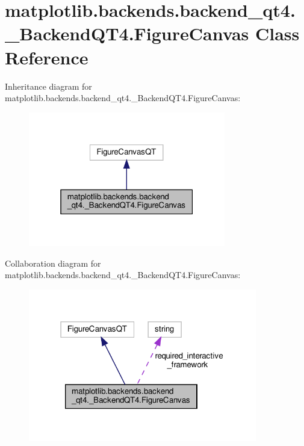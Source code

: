 \hypertarget{classmatplotlib_1_1backends_1_1backend__qt4_1_1__BackendQT4_1_1FigureCanvas}{}\section{matplotlib.\+backends.\+backend\+\_\+qt4.\+\_\+\+Backend\+Q\+T4.\+Figure\+Canvas Class Reference}
\label{classmatplotlib_1_1backends_1_1backend__qt4_1_1__BackendQT4_1_1FigureCanvas}


Inheritance diagram for matplotlib.\+backends.\+backend\+\_\+qt4.\+\_\+\+Backend\+Q\+T4.\+Figure\+Canvas\+:
\nopagebreak
\begin{figure}[H]
\begin{center}
\leavevmode
\includegraphics[width=244pt]{classmatplotlib_1_1backends_1_1backend__qt4_1_1__BackendQT4_1_1FigureCanvas__inherit__graph}
\end{center}
\end{figure}


Collaboration diagram for matplotlib.\+backends.\+backend\+\_\+qt4.\+\_\+\+Backend\+Q\+T4.\+Figure\+Canvas\+:
\nopagebreak
\begin{figure}[H]
\begin{center}
\leavevmode
\includegraphics[width=283pt]{classmatplotlib_1_1backends_1_1backend__qt4_1_1__BackendQT4_1_1FigureCanvas__coll__graph}
\end{center}
\end{figure}
